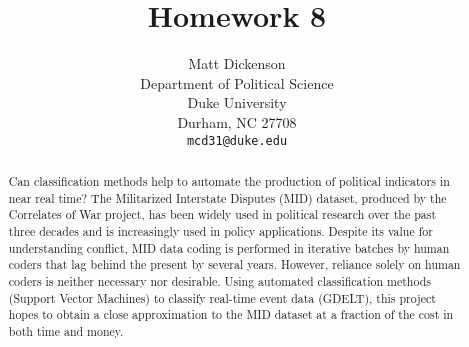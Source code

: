 \documentclass[12pt,letterpaper]{article} %
\title{Homework 8}
\author{
Matt Dickenson\\
Department of Political Science\\
Duke University\\
Durham, NC 27708 \\
\texttt{mcd31@duke.edu}
}
\begin{document}
\maketitle

\begin{abstract}
Can classification methods help to automate the production of political indicators in near real time? The Militarized Interstate Disputes (MID) dataset, produced by the Correlates of War project, has been widely used in political research over the past three decades and is increasingly used in policy applications. Despite its value for understanding conflict, MID data coding is performed in iterative batches by human coders that lag behind the present by several years. However, reliance solely on human coders is neither necessary nor desirable. Using automated classification methods (Support Vector Machines) to classify real-time event data (GDELT), this project hopes to obtain a close approximation to the MID dataset at a fraction of the cost in both time and money. 
\end{abstract}





\end{document}
